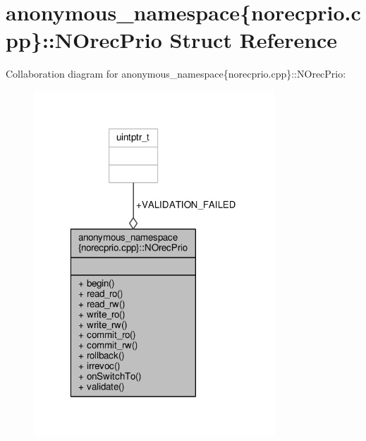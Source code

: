 \hypertarget{structanonymous__namespace_02norecprio_8cpp_03_1_1NOrecPrio}{\section{anonymous\-\_\-namespace\{norecprio.\-cpp\}\-:\-:N\-Orec\-Prio Struct Reference}
\label{structanonymous__namespace_02norecprio_8cpp_03_1_1NOrecPrio}
}


Collaboration diagram for anonymous\-\_\-namespace\{norecprio.\-cpp\}\-:\-:N\-Orec\-Prio\-:
\nopagebreak
\begin{figure}[H]
\begin{center}
\leavevmode
\includegraphics[width=256pt]{structanonymous__namespace_02norecprio_8cpp_03_1_1NOrecPrio__coll__graph}
\end{center}
\end{figure}
